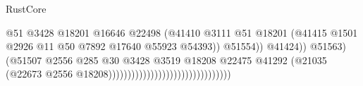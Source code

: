 \begin{lexlean}{RustCore}
\begin{coremodule}
                                                                        @51
                                                                        @3428
                                                                        @18201
                                                                        @16646
                                                                        @22498
                                                                        (@41410
                                                                          @3111
                                                                          @51
                                                                          @18201
                                                                          (@41415
                                                                            @1501
                                                                            @2926
                                                                            @11
                                                                            @50
                                                                            @7892
                                                                            @17640
                                                                            @55923
                                                                            @54393))
                                                                        @51554))
                                                                    @41424))
                                                                @51563)
                                                              (@51507
                                                                @2556
                                                                @285
                                                                @30
                                                                @3428
                                                                @3519
                                                                @18208
                                                                @22475
                                                                @41292
                                                                (@21035
                                                                  (@22673
                                                                    @2556
                                                                    @18208))))))))))))))))))))))))))))))))

\end{coremodule}
\end{lexlean}
